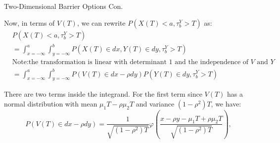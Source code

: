 \documentclass{beamer}
\begin{document}
\begin{frame}{Two-Dimensional Barrier Options Con.}

    {\footnotesize \footnotesize
    \par Now, in terms of \(V(T)\), we can rewrite \(P(X(T) < a,  \tau_b^Y > T)\) as:
        \begin{align*}
        &P(X(T) < a,  \tau_b^Y > T) \\
        &= \int_{x=-\infty}^{a} \int_{y=-\infty}^{b} P(X(T) \in dx,  Y(T) \in dy,  \tau_b^Y > T) \\
        &\text{Note:the transformation is linear with determinant 1 and the independence of \(V\) and \(Y\)}\\
        &= \int_{x=-\infty}^{a} \int_{y=-\infty}^{b} P(V(T) \in dx - \rho dy) P(Y(T) \in dy,  \tau_b^Y > T)
        \end{align*}
    \par There are two terms inside the integrand. For the first term since \( V(T) \) has a normal distribution with mean \( \mu_1 T - \rho \mu_2 T \) 
    and variance \( (1 - \rho^2)T \), we have:
        \[
        P(V(T) \in dx - \rho dy) = \frac{1}{\sqrt{(1 - \rho^2)T}} \varphi \left( \frac{x - \rho y - \mu_1 T + \rho \mu_2 T}{\sqrt{(1 - \rho^2)T}} \right),
        \]
    }
\end{frame}
    
\end{document}
